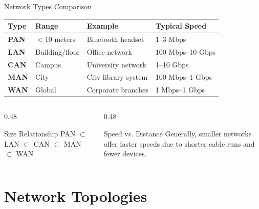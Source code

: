\documentclass[aspectratio=169]{beamer}  %
\begin{document}
\begin{frame}{Network Types Comparison}
    \begin{center}
        \begin{tabular}{>{\bfseries}l l l l}
            \toprule
            \textbf{Type} & \textbf{Range} & \textbf{Example} & \textbf{Typical Speed} \\
            \midrule
            PAN & $<$10 meters & Bluetooth headset & 1--3 Mbps \\
            LAN & Building/floor & Office network & 100 Mbps--10 Gbps \\
            CAN & Campus & University network & 1--10 Gbps \\
            MAN & City & City library system & 100 Mbps--1 Gbps \\
            WAN & Global & Corporate branches & 1 Mbps--1 Gbps \\
            \bottomrule
        \end{tabular}
    \end{center}
    
    \vspace{0.5em}
    
    \begin{columns}[T]
        \begin{column}{0.48\textwidth}
            \begin{block}{Size Relationship}
                PAN $\subset$ LAN $\subset$ CAN $\subset$ MAN $\subset$ WAN
            \end{block}
        \end{column}
        \begin{column}{0.48\textwidth}
            \begin{block}{Speed vs. Distance}
                Generally, smaller networks offer faster speeds due to shorter cable runs and fewer devices.
            \end{block}
        \end{column}
    \end{columns}
\end{frame}

\section{Network Topologies}
\end{document}
